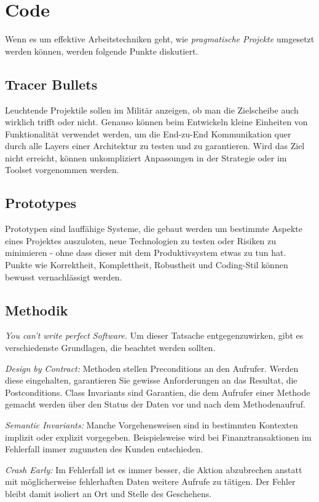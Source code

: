 \documentclass[10pt, oneside]{article}
\begin{document}
\section{Code}
Wenn es um effektive Arbeitstechniken geht, wie \emph{pragmatische Projekte} umgesetzt werden können, werden folgende Punkte diskutiert.
\subsection{Tracer Bullets}
Leuchtende Projektile sollen im Militär anzeigen, ob man die Zielscheibe auch wirklich trifft oder nicht. 
Genauso können beim Entwickeln kleine Einheiten von Funktionalität verwendet werden, um die End-zu-End Kommunikation quer durch alle Layers einer Architektur zu testen und zu garantieren.
Wird das Ziel nicht erreicht, können unkompliziert Anpassungen in der Strategie oder im Toolset vorgenommen werden.

\subsection{Prototypes}
Prototypen sind lauffähige Systeme, die gebaut werden um bestimmte Aspekte eines Projektes auszuloten, neue Technologien zu testen oder Risiken zu minimieren - ohne dass dieser mit dem Produktivsystem
etwas zu tun hat.
Punkte wie Korrektheit, Komplettheit, Robustheit und Coding-Stil können bewusst vernachlässigt werden. 

\subsection{Methodik}
\emph{You can't write perfect Software.}
Um dieser Tatsache entgegenzuwirken, gibt es verschiedenste Grundlagen, die beachtet werden sollten.

\emph{Design by Contract: } Methoden stellen Preconditions an den Aufrufer. Werden diese eingehalten, 
    garantieren Sie gewisse Anforderungen an das Resultat, die Postconditions. Class Invariants sind Garantien, 
    die dem Aufrufer einer Methode gemacht werden über den Status der Daten vor und nach dem Methodenaufruf. 

\emph{Semantic Invariants: } Manche Vorgehensweisen sind in bestimmten Kontexten implizit oder explizit vorgegeben.
Beispielsweise wird bei Finanztransaktionen im Fehlerfall immer zugunsten des Kunden entschieden.

\emph{Crash Early: } Im Fehlerfall ist es immer besser, die Aktion abzubrechen anstatt mit möglicherweise fehlerhaften Daten weitere Aufrufe zu tätigen. 
Der Fehler bleibt damit isoliert an Ort und Stelle des Geschehens.
\end{document}

